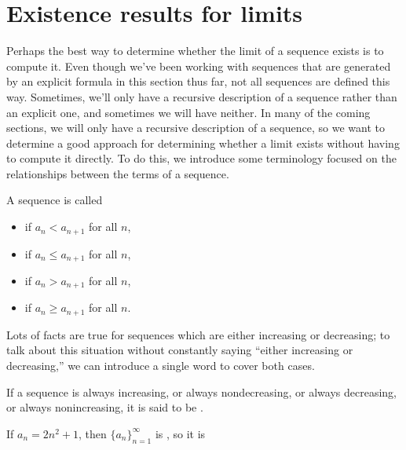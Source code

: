 \documentclass{ximera}
\begin{document}
\section{Existence results for limits}

Perhaps the best way to determine whether the limit of a sequence exists is to compute it.  Even though we've been working with sequences that are generated by an explicit formula in this section thus far, not all sequences are defined this way.  Sometimes, we'll only have a recursive description of a sequence rather than an explicit one, and sometimes we will have neither.  In many of the coming sections, we will only have a recursive description of a sequence, so we want to determine a good approach for determining whether a limit exists without having to compute it directly.  To do this, we introduce some terminology focused on the relationships between the terms of a sequence.

\begin{definition}
  A sequence is called
  \begin{itemize}
    \item {} if $a_n<a_{n+1}$ for all $n$,
    \item {} if $a_n\le a_{n+1}$ for all $n$,
    \item {} if $a_n>a_{n+1}$ for all $n$,
    \item {} if $a_n\ge a_{n+1}$ for all $n$.
  \end{itemize}
\end{definition}

Lots of facts are true for sequences which are either increasing or
decreasing; to talk about this situation without constantly saying
``either increasing or decreasing,'' we can introduce a single word to
cover both cases.
\begin{definition}
  If a sequence is always increasing, or  always nondecreasing, or always decreasing, or always nonincreasing, it is said to be .
\end{definition}


\begin{example}
If $a_n = 2n^2+1$, then $\{a_n\}_{n=1}^{\infty}$ is , so it is
\end{example}
\end{document}
